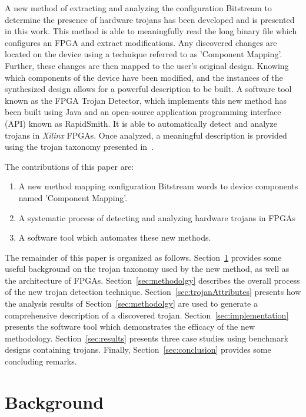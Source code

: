 \documentclass[journal, hidelinks]{IEEEtran}
\begin{document}
A new method of extracting and analyzing the configuration Bitstream to determine the presence of hardware trojans has been developed and is presented in this work.
This method is able to meaningfully read the long binary file which configures an FPGA and extract modifications.
Any discovered changes are located on the device using a technique referred to as 'Component Mapping'.
Further, these changes are then mapped to the user's original design.
Knowing which components of the device have been modified, and the instances of the synthesized design allows for a powerful description to be built.
A software tool known as the FPGA Trojan Detector, which implements this new method has been built using Java and an open-source application programming interface (API) known as RapidSmith. 
It is able to automatically detect and analyze trojans in \textit{Xilinx} FPGAs.
Once analyzed, a meaningful description is provided using the trojan taxonomy presented in~\cite{SMoein5}.

The contributions of this paper are:
\begin{enumerate}
	\item A new method mapping configuration Bitstream words to device components named 'Component Mapping'.
	\item A systematic process of detecting and analyzing hardware trojans in FPGAs
	\item A software tool which automates these new methods.
\end{enumerate}

The remainder of this paper is organized as follows.
Section~\ref{sec:background} provides some useful background on the trojan taxonomy used by the new method, as well as the architecture of FPGAs.
Section~\ref{sec:methodolgy} describes the overall process of the new trojan detection technique.
Section~\ref{sec:trojanAttributes} presents how the analysis results of Section~\ref{sec:methodolgy} are used to generate a comprehensive description of a discovered trojan.
Section~\ref{sec:implementation} presents the software tool which demonstrates the efficacy of the new methodology.
Section~\ref{sec:results} presents three case studies using benchmark designs containing trojans.
Finally, Section~\ref{sec:conclusion} provides some concluding remarks.

\section{Background} \label{sec:background}
\end{document}
